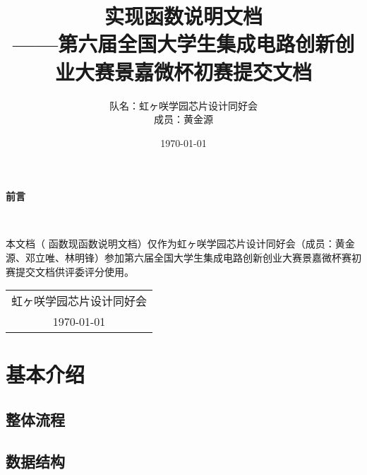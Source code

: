 \documentclass[12pt, a4paper, oneside]{ctexbook}
\title{{\Huge{\textbf{实现函数说明文档}}}\normalsize{\\——第六届全国大学生集成电路创新创业大赛景嘉微杯初赛提交文档}}
\author{队名：虹ヶ咲学园芯片设计同好会\\ 成员：黄金源\space邓立唯\space林明锋}
\date{\today}
\begin{document}
	
	\maketitle	
	\setcounter{page}{1}
	\begin{center}
		\Huge\textbf{前言}
	\end{center}~\

本文档（ 函数现函数说明文档）仅作为虹ヶ咲学园芯片设计同好会（成员：黄金源、邓立唯、林明锋）参加第六届全国大学生集成电路创新创业大赛景嘉微杯赛初赛提交文档供评委评分使用。
	~\\
	\begin{flushright}
		\begin{tabular}{c}
			虹ヶ咲学园芯片设计同好会\\
			\today
		\end{tabular}
	\end{flushright}
	\newpage
	\setcounter{page}{1}
	\tableofcontents
	\newpage
	\setcounter{page}{1}
	
	\chapter{基本介绍}
	\section{整体流程}
	\section{数据结构}
\end{document}
